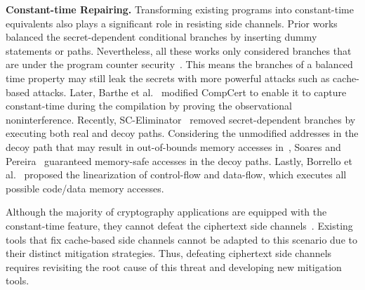 \noindent \textbf{Constant-time Repairing.}
Transforming existing programs into constant-time equivalents also plays a significant role in resisting side
channels. 
Prior works~\cite{agat2000transforming, kopf2007transformational, barthe2006preventing, molnar2005program, coppens2009practical} balanced the secret-dependent conditional branches by inserting dummy statements or paths.
Nevertheless, all these works only considered branches that are under the program counter security~\cite{molnar2005program}.
This means the branches of a balanced time property may still leak the secrets with more powerful attacks such as
cache-based attacks. 
Later, Barthe et al.~\cite{barthe2020formal} modified CompCert to enable it to capture constant-time during the compilation by proving the observational noninterference. 
Recently, SC-Eliminator~\cite{wu2018eliminating} removed secret-dependent branches by executing both real and decoy paths. 
Considering the unmodified addresses in the decoy path that may result in out-of-bounds memory accesses in~\cite{wu2018eliminating}, Soares and Pereira~\cite{soares2021memory} guaranteed memory-safe accesses in the decoy paths. 
Lastly, Borrello et al.~\cite{borrello2021constantine} proposed the linearization of control-flow and data-flow, which executes all possible code/data memory accesses.

Although the majority of cryptography applications are equipped with the constant-time feature, they cannot defeat the ciphertext side channels~\cite{li2021cipherleaks, li2022systematic, deng2023cipherh}.
Existing tools that fix cache-based side channels cannot be adapted to this scenario due to their distinct mitigation strategies.
Thus, defeating ciphertext side channels requires revisiting the root cause of this threat and developing new mitigation tools.
